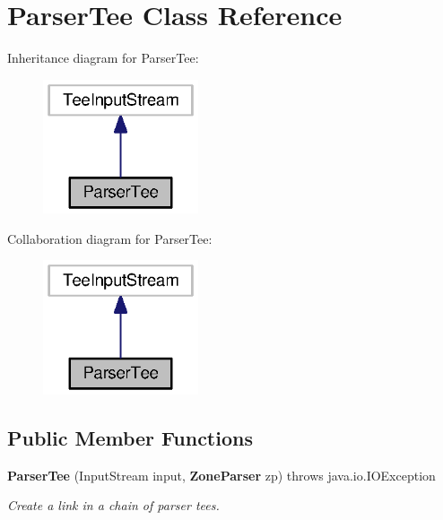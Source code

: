 \section{Parser\-Tee Class Reference}
\label{classorg_1_1smallfoot_1_1parser_1_1ParserTee}


Inheritance diagram for Parser\-Tee\-:\nopagebreak
\begin{figure}[H]
\begin{center}
\leavevmode
\includegraphics[width=130pt]{classorg_1_1smallfoot_1_1parser_1_1ParserTee__inherit__graph}
\end{center}
\end{figure}


Collaboration diagram for Parser\-Tee\-:\nopagebreak
\begin{figure}[H]
\begin{center}
\leavevmode
\includegraphics[width=130pt]{classorg_1_1smallfoot_1_1parser_1_1ParserTee__coll__graph}
\end{center}
\end{figure}
\subsection*{Public Member Functions}
\begin{DoxyCompactItemize}
\item 
{\bf Parser\-Tee} (Input\-Stream input, {\bf Zone\-Parser} zp)  throws java.\-io.\-I\-O\-Exception     
\begin{DoxyCompactList}\small\item\em Create a link in a chain of parser tees. \end{DoxyCompactList}\end{DoxyCompactItemize}
